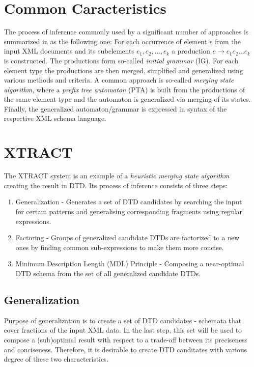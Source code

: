 \section{Common Caracteristics}
The process of inference commonly used by a significant number of approaches is summarized in \cite{Mlynkova:2008:AAX:1494650.1495496} as the following one: For each occurrence of element $e$ from the input XML documents and its subelements $e_1, e_2, ..., e_k$ a production $e \rightarrow e_1 e_2 ... e_k$ is constructed. The productions form so-called \emph{initial grammar} (IG). For each element type the productions are then merged, simplified and generalized using various methods and criteria. A common approach is so-called \emph{merging state algorithm}, where a \emph{prefix tree automaton} (PTA) is built from the productions of the same element type and the automaton is generalized via merging of its states. Finally, the generalized automaton/grammar is expressed in syntax of the respective XML schema language.

\section{XTRACT} \label{section_xtract}
The XTRACT \cite{Garofalakis:2000:XSE:342009.335409} system is an example of a \emph{heuristic} \emph{merging state algorithm} creating the result in DTD. Its process of inference consists of three steps:
\begin{enumerate}
\item Generalization - Generates a set of DTD candidates by searching the input for certain patterns and generalising corresponding fragments using regular expressions.
\item Factoring - Groups of generalized candidate DTDs are factorized to a new ones by finding common sub-expressions to make them more concise.
\item Minimum Description Length (MDL) Principle - Composing a near-optimal DTD schema from the set of all generalized candidate DTDs.
\end{enumerate}

\subsection{Generalization}
Purpose of generalization is to create a set of DTD candidates - schemata that cover fractions of the input XML data. In the last step, this set will be used to compose a (sub)optimal result with respect to a trade-off between its preciseness and conciseness. Therefore, it is desirable to create DTD canditates with various degree of these two characteristics.


